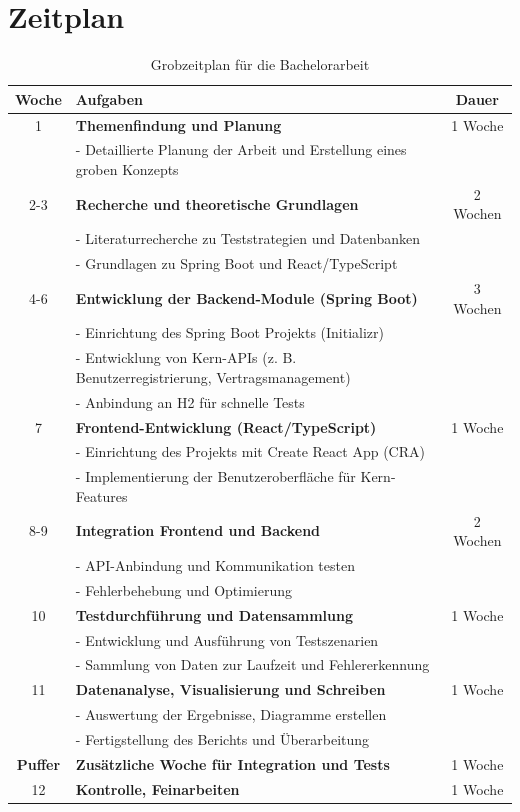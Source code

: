 \chapter{Zeitplan}

\begin{table}[h]
	\centering
	\begin{tabular}{|c|p{10cm}|c|}
		\hline
		\textbf{Woche} & \textbf{Aufgaben} & \textbf{Dauer} \\
		\hline
		1 & \textbf{Themenfindung und Planung} & 1 Woche \\
		& - Detaillierte Planung der Arbeit und Erstellung eines groben Konzepts & \\
		\hline
		2-3 & \textbf{Recherche und theoretische Grundlagen} & 2 Wochen \\
		& - Literaturrecherche zu Teststrategien und Datenbanken & \\
		& - Grundlagen zu Spring Boot und React/TypeScript & \\
		\hline
		4-6 & \textbf{Entwicklung der Backend-Module (Spring Boot)} & 3 Wochen \\
		& - Einrichtung des Spring Boot Projekts (Initializr) & \\
		& - Entwicklung von Kern-APIs (z. B. Benutzerregistrierung, Vertragsmanagement) & \\
		& - Anbindung an H2 für schnelle Tests & \\
		\hline
		7 & \textbf{Frontend-Entwicklung (React/TypeScript)} & 1 Woche \\
		& - Einrichtung des Projekts mit Create React App (CRA) & \\
		& - Implementierung der Benutzeroberfläche für Kern-Features & \\
		\hline
		8-9 & \textbf{Integration Frontend und Backend} & 2 Wochen \\
		& - API-Anbindung und Kommunikation testen & \\
		& - Fehlerbehebung und Optimierung & \\
		\hline
		10 & \textbf{Testdurchführung und Datensammlung} & 1 Woche \\
		& - Entwicklung und Ausführung von Testszenarien & \\
		& - Sammlung von Daten zur Laufzeit und Fehlererkennung & \\
		\hline
		11 & \textbf{Datenanalyse, Visualisierung und Schreiben} & 1 Woche \\
		& - Auswertung der Ergebnisse, Diagramme erstellen & \\
		& - Fertigstellung des Berichts und Überarbeitung & \\
		\hline
		\textbf{Puffer} & \textbf{Zusätzliche Woche für Integration und Tests} & 1 Woche \\
		\hline
		12 & \textbf{Kontrolle, Feinarbeiten} & 1 Woche \\
		\hline
		\hline
	\end{tabular}
	\caption{Grobzeitplan für die Bachelorarbeit}
\end{table}
